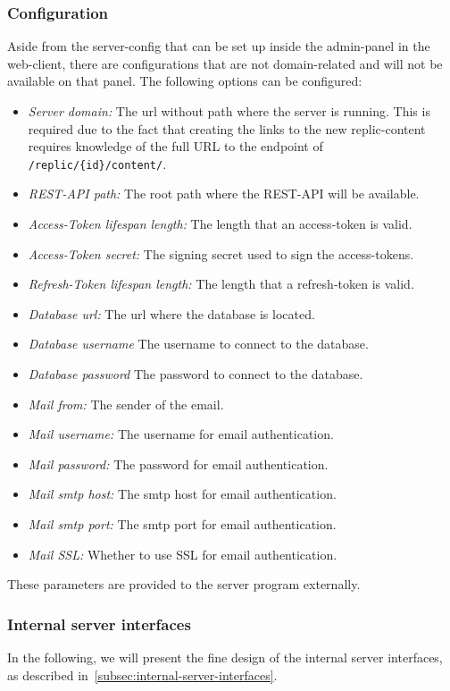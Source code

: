 \subsubsection{Configuration}
Aside from the server-config that can be set up inside the admin-panel in the web-client, there are configurations that are not domain-related and will not be available on that panel.
The following options can be configured:
\begin{itemize}
    \item \textit{Server domain:} The url without path where the server is running.
    This is required due to the fact that creating the links to the new replic-content requires knowledge of the full URL to the endpoint of \texttt{/replic/\{id\}/content/}.
    \item \textit{REST-API path:} The root path where the REST-API will be available.
    \item \textit{Access-Token lifespan length:} The length that an access-token is valid.
    \item \textit{Access-Token secret:} The signing secret used to sign the access-tokens.
    \item \textit{Refresh-Token lifespan length:} The length that a refresh-token is valid.
    \item \textit{Database url:} The url where the database is located.
    \item \textit{Database username} The username to connect to the database.
    \item \textit{Database password} The password to connect to the database.
    \item \textit{Mail from:} The sender of the email.
    \item \textit{Mail username:} The username for email authentication.
    \item \textit{Mail password:} The password for email authentication.
    \item \textit{Mail smtp host:} The smtp host for email authentication.
    \item \textit{Mail smtp port:} The smtp port for email authentication.
    \item \textit{Mail SSL:} Whether to use SSL for email authentication.
\end{itemize}
These parameters are provided to the server program externally.

\subsubsection{Internal server interfaces}
In the following, we will present the fine design of the internal server interfaces, as described in~\ref{subsec:internal-server-interfaces}.

